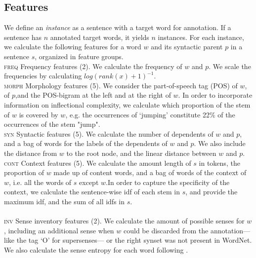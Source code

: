 \documentclass[11pt,a4paper]{article}
\begin{document}
\subsection{Features}
We define an \textit{instance} as a sentence with a target word for annotation. If a sentence has $n$ annotated target words, it yields $n$ instances. For each instance, we calculate the following features for a word $w$ and its syntactic parent $p$ in a sentence $s$, organized in feature groups.\\ 
\noindent\textsc{freq} Frequency features (2). We calculate the frequency of $w$ and $p$. We scale the frequencies by calculating $log(rank(x)+1)^{-1}$.\\
\textsc{morph} Morphology features (5). We consider the part-of-speech tag (POS) of $w$, of $p$,and the POS-bigram at the left and at the right of $w$. In order to incorporate information on inflectional complexity, we calculate which proportion of the stem of $w$ is covered by $w$, e.g. the occurrences of `jumping' constitute 22\% of the occurrences of the stem "jump". \\
\textsc{syn} Syntactic features (5). We calculate the number of dependents of $w$ and $p$, and a bag of words for the labels of the dependents of $w$ and $p$. We also include the distance from $w$ to the root node, and the linear distance between $w$ and $p$.\\
\textsc{cont} Context features (5). We calculate the amount length of $s$ in tokens, the proportion of $w$ made up of content words, and a bag of words of the context of $w$, i.e. all the words of $s$ except $w$.In order to capture the specificity of the context, we calculate the sentence-wise idf of each stem in $s$, and provide the maximum idf, and the sum of all idfs in $s$. \\ \\
\textsc{inv} Sense inventory features (2). We calculate the amount of possible senses for $w$, including an additional sense when $w$ could be discarded from the annotation---like the tag `O' for supersenses--- or the right synset was not present in WordNet. We also calculate the sense entropy for each word following . 

\end{document}
